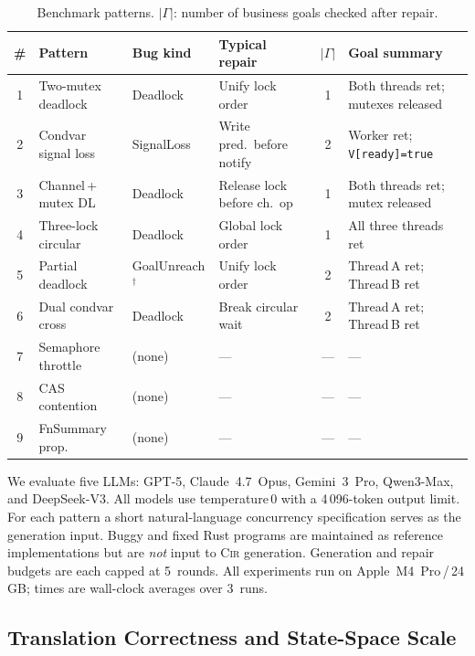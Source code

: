 \documentclass{article}
\begin{document}
\begin{table}[t]
\caption{Benchmark patterns.
$|\Gamma|$: number of business goals checked after repair.}
\label{tab:test-matrix}
\centering\footnotesize
\begin{tabular}{@{}clll c p{3.6cm}@{}}
\toprule
\textbf{\#} & \textbf{Pattern} & \textbf{Bug kind}
  & \textbf{Typical repair}
  & $|\Gamma|$
  & \textbf{Goal summary} \\
\midrule
1  & Two-mutex deadlock & Deadlock
   & Unify lock order
   & 1 & Both threads ret; mutexes released \\[2pt]
2  & Condvar signal loss
   & SignalLoss 
   & Write pred.\ before notify
   & 2 & Worker ret; \texttt{V[ready]=true} \\[2pt]
3  & Channel\,+\,mutex DL
   & Deadlock
   & Release lock before ch.\ op
   & 1 & Both threads ret; mutex released \\[2pt]
4  & Three-lock circular
   & Deadlock 
   & Global lock order
   & 1 & All three threads ret \\[2pt]
5  & Partial deadlock
   & GoalUnreach$^\dagger$ 
   & Unify lock order
   & 2 & Thread\,A ret; Thread\,B ret \\[2pt]
6  & Dual condvar cross
   & Deadlock 
   & Break circular wait
   & 2 & Thread\,A ret; Thread\,B ret \\[2pt]
\midrule
7  & Semaphore throttle 
   & (none) 
   & --- & --- & --- \\[2pt]
8  & CAS contention 
   & (none) 
   & --- & --- & --- \\[2pt]
9  & FnSummary prop.\ 
   & (none)
   & --- & --- & --- \\
\bottomrule
\end{tabular}
\end{table}

We evaluate five LLMs: GPT-5, Claude~4.7~Opus, Gemini~3~Pro, Qwen3-Max, and DeepSeek-V3.  All models use temperature\,0 with a 4\,096-token output limit. For each pattern a short natural-language concurrency specification serves as the generation input. Buggy and fixed Rust programs are maintained as reference implementations but are \emph{not} input to \textsc{Cir} generation. Generation and repair budgets are each capped at 5~rounds.  All experiments run on
Apple~M4~Pro\,/\,24\,GB; times are wall-clock averages over 3~runs.

\subsection{Translation Correctness and State-Space Scale}
\label{subsec:translation-results}
\end{document}
